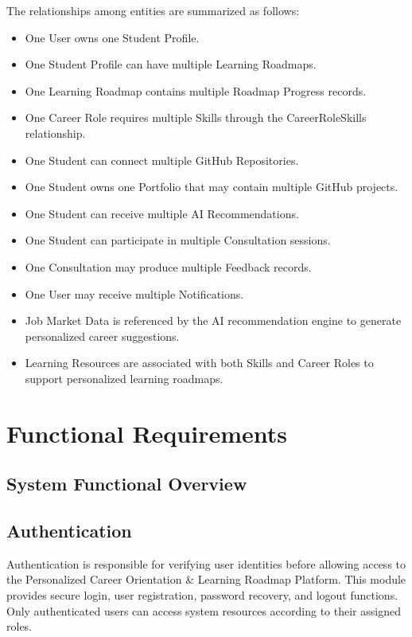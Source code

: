The relationships among entities are summarized as follows:

\begin{itemize}
    \item One User owns one Student Profile.
    \item One Student Profile can have multiple Learning Roadmaps.
    \item One Learning Roadmap contains multiple Roadmap Progress records.
    \item One Career Role requires multiple Skills through the CareerRoleSkills relationship.
    \item One Student can connect multiple GitHub Repositories.
    \item One Student owns one Portfolio that may contain multiple GitHub projects.
    \item One Student can receive multiple AI Recommendations.
    \item One Student can participate in multiple Consultation sessions.
    \item One Consultation may produce multiple Feedback records.
    \item One User may receive multiple Notifications.
    \item Job Market Data is referenced by the AI recommendation engine to generate personalized career suggestions.
    \item Learning Resources are associated with both Skills and Career Roles to support personalized learning roadmaps.
\end{itemize}

\section{Functional Requirements}

\subsection{System Functional Overview}

\subsection{Authentication}

Authentication is responsible for verifying user identities before allowing access to the Personalized Career Orientation \& Learning Roadmap Platform. This module provides secure login, user registration, password recovery, and logout functions. Only authenticated users can access system resources according to their assigned roles.


